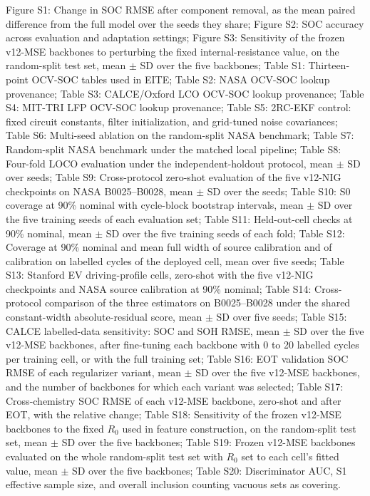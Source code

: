 Figure S1: Change in SOC RMSE after component removal, as the mean paired difference from the full model over the seeds they share; Figure S2: SOC accuracy across evaluation and adaptation settings; Figure S3: Sensitivity of the frozen v12-MSE backbones to perturbing the fixed internal-resistance value, on the random-split test set, mean $\pm$ SD over the five backbones; Table S1: Thirteen-point OCV-SOC tables used in EITE; Table S2: NASA OCV-SOC lookup provenance; Table S3: CALCE/Oxford LCO OCV-SOC lookup provenance; Table S4: MIT-TRI LFP OCV-SOC lookup provenance; Table S5: 2RC-EKF control: fixed circuit constants, filter initialization, and grid-tuned noise covariances; Table S6: Multi-seed ablation on the random-split NASA benchmark; Table S7: Random-split NASA benchmark under the matched local pipeline; Table S8: Four-fold LOCO evaluation under the independent-holdout protocol, mean $\pm$ SD over seeds; Table S9: Cross-protocol zero-shot evaluation of the five v12-NIG checkpoints on NASA B0025--B0028, mean $\pm$ SD over the seeds; Table S10: S0 coverage at 90\% nominal with cycle-block bootstrap intervals, mean $\pm$ SD over the five training seeds of each evaluation set; Table S11: Held-out-cell checks at 90\% nominal, mean $\pm$ SD over the five training seeds of each fold; Table S12: Coverage at 90\% nominal and mean full width of source calibration and of calibration on labelled cycles of the deployed cell, mean over five seeds; Table S13: Stanford EV driving-profile cells, zero-shot with the five v12-NIG checkpoints and NASA source calibration at 90\% nominal; Table S14: Cross-protocol comparison of the three estimators on B0025--B0028 under the shared constant-width absolute-residual score, mean $\pm$ SD over five seeds; Table S15: CALCE labelled-data sensitivity: SOC and SOH RMSE, mean $\pm$ SD over the five v12-MSE backbones, after fine-tuning each backbone with 0 to 20 labelled cycles per training cell, or with the full training set; Table S16: EOT validation SOC RMSE of each regularizer variant, mean $\pm$ SD over the five v12-MSE backbones, and the number of backbones for which each variant was selected; Table S17: Cross-chemistry SOC RMSE of each v12-MSE backbone, zero-shot and after EOT, with the relative change; Table S18: Sensitivity of the frozen v12-MSE backbones to the fixed $R_0$ used in feature construction, on the random-split test set, mean $\pm$ SD over the five backbones; Table S19: Frozen v12-MSE backbones evaluated on the whole random-split test set with $R_0$ set to each cell's fitted value, mean $\pm$ SD over the five backbones; Table S20: Discriminator AUC, S1 effective sample size, and overall inclusion counting vacuous sets as covering.
